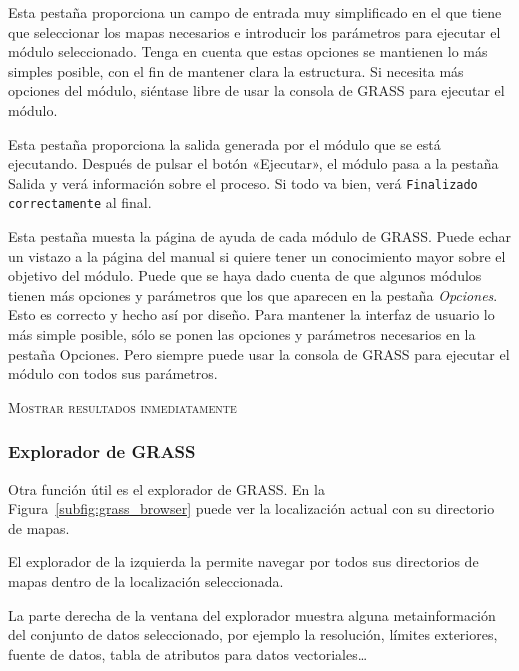 Esta pestaña proporciona un campo de entrada muy simplificado en el que tiene que seleccionar los mapas necesarios e introducir los parámetros para ejecutar el módulo seleccionado. Tenga en cuenta que estas opciones se mantienen lo más simples posible, con el fin de mantener clara la estructura. Si necesita más opciones del módulo, siéntase libre de usar la consola de GRASS para ejecutar el módulo.


Esta pestaña proporciona la salida generada por el módulo que se está ejecutando. Después de pulsar el botón «Ejecutar», el módulo pasa a la pestaña Salida y verá información sobre el proceso. Si todo va bien, verá \texttt{Finalizado correctamente} al final.


Esta pestaña muesta la página de ayuda de cada módulo de GRASS. Puede echar un vistazo a la página del manual si quiere tener un conocimiento mayor sobre el objetivo del módulo. Puede que se haya dado cuenta de que algunos módulos tienen más opciones y parámetros que los que aparecen en la pestaña \textit{Opciones}. Esto es correcto y hecho así por diseño. Para mantener la interfaz de usuario lo más simple posible, sólo se ponen las opciones y parámetros necesarios en la pestaña Opciones. Pero siempre puede usar la consola de GRASS para ejecutar el módulo con todos sus parámetros.

\begin{Tip}\caption{\textsc{Mostrar resultados inmediatamente}}
\end{Tip} 


\subsubsection{Explorador de GRASS} 

Otra función útil es el explorador de GRASS. En la Figura~\ref{subfig:grass_browser} puede ver la localización actual con su directorio de mapas.

El explorador de la izquierda la permite navegar por todos sus directorios de mapas dentro de la localización seleccionada.

La parte derecha de la ventana del explorador muestra alguna metainformación del conjunto de datos seleccionado, por ejemplo la resolución, límites exteriores, fuente de datos, tabla de atributos para datos vectoriales\dots

